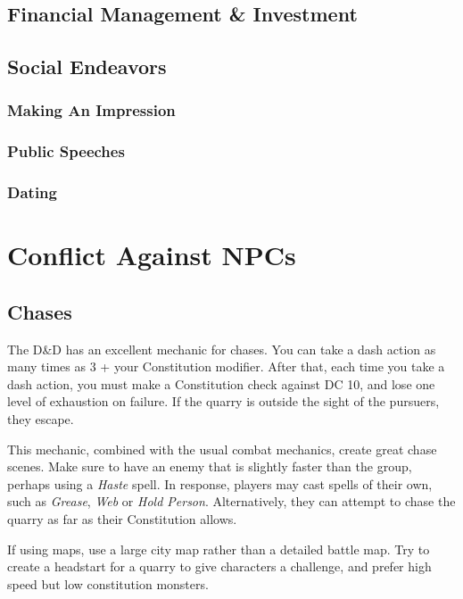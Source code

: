 \documentclass[twocolumn]{dndbook}
\begin{document}
\section{Financial Management \& Investment}


\section{Social Endeavors}
\subsection{Making An Impression}
\subsection{Public Speeches}
\subsection{Dating}

\chapter{Conflict Against NPCs}
\section{Chases}

The D\&D has an excellent mechanic for chases.
You can take a dash action as many times as 3 + your Constitution modifier.
After that, each time you take a dash action, you must make a Constitution check against DC 10, and lose one level of exhaustion on failure.
If the quarry is outside the sight of the pursuers, they escape.\par

This mechanic, combined with the usual combat mechanics, create great chase scenes.
Make sure to have an enemy that is slightly faster than the group, perhaps using a \emph{Haste} spell.
In response, players may cast spells of their own, such as \emph{Grease}, \emph{Web} or \emph{Hold Person}.
Alternatively, they can attempt to chase the quarry as far as their Constitution allows.\par

If using maps, use a large city map rather than a detailed battle map.
Try to create a headstart for a quarry to give characters a challenge, and prefer high speed but low constitution monsters.\par
\end{document}
